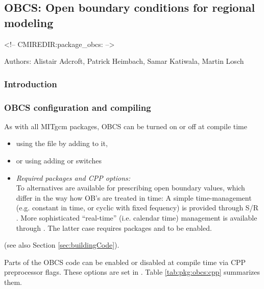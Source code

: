 \subsection{OBCS: Open boundary conditions for regional modeling}

\label{sec:pkg:obcs}
\begin{rawhtml}
<!-- CMIREDIR:package_obcs: -->
\end{rawhtml}

Authors: 
Alistair Adcroft, Patrick Heimbach, Samar Katiwala, Martin Losch

\subsubsection{Introduction
\label{sec:pkg:obcs:intro}}




\subsubsection{OBCS configuration and compiling
\label{sec:pkg:obcs:comp}}

As with all MITgcm packages, OBCS can be turned on or off 
at compile time
%
\begin{itemize}
%
\item
using the  file by adding  to it,
%
\item
or using  adding
 or  switches
%
\item
\textit{Required packages and CPP options:} \\
%
To alternatives are available for prescribing open boundary values,
which differ in the way how OB's are treated in time:
A simple time-management (e.g. constant in time, or cyclic with
fixed fequency) is provided through 
S/R .
More sophisticated ``real-time'' (i.e. calendar time) management is
available through . 
The latter case requires
packages  and  to be enabled.
%
\end{itemize}
(see also Section \ref{sec:buildingCode}).

Parts of the OBCS code can be enabled or disabled at compile time
via CPP preprocessor flags. These options are set in
. Table \ref{tab:pkg:obcs:cpp} summarizes them.

